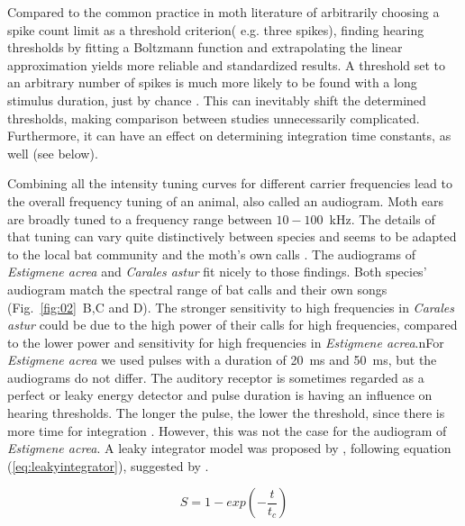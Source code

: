 \documentclass[12pt,a4paper,pdftex]{article}
\newcommand{\species}[1]{\textit{#1}}
\newcommand{\fig}[2]{(Fig.~#1~#2)}
\begin{document}
Compared to the common practice in moth literature of arbitrarily choosing  a spike count limit as a threshold criterion( e.g. three spikes), finding hearing thresholds by fitting a Boltzmann function and extrapolating the linear approximation yields more reliable and standardized results. A threshold set to an arbitrary number of spikes is much more likely to be found with a long stimulus duration, just by chance \cite{waters2003}. This can inevitably shift the determined thresholds, making comparison between studies unnecessarily complicated. Furthermore, it can have an effect on determining integration time constants, as well (see below).

Combining all the intensity tuning curves for different carrier frequencies lead to the overall frequency tuning of an animal, also called an audiogram. Moth ears are broadly tuned to a frequency range between $10-100$~kHz. The details of that tuning can vary quite distinctively between species and seems to be adapted to the local bat community and the moth's own calls \cite{fullard1984b, terhofstede2013, nakano2014}. The audiograms of \species{Estigmene acrea} and \species{Carales astur} fit nicely to those findings. Both species' audiogram match the spectral range of bat calls and their own songs \fig{\ref{fig:02}}{B,C and D}. The stronger sensitivity to high frequencies in \species{Carales astur} could be due to the high power of their calls for high frequencies, compared to the lower power and sensitivity for high frequencies in \species{Estigmene acrea}.nFor \species{Estigmene acrea} we used pulses with a duration of 20~ms and 50~ms, but the audiograms do not differ. The auditory receptor is sometimes regarded as a perfect or leaky energy detector and pulse duration is having an influence on hearing thresholds. The longer the pulse, the lower the threshold, since there is more time for integration \cite{surlykke1988, tougaard1996, tougaard1998}. However, this was not the case for the audiogram of \species{Estigmene acrea}. 
A leaky integrator model was proposed by \cite{waters1996}, following equation (\ref{eq:leakyintegrator}), suggested by \cite{plomp1959}.

\begin{equation}
\label{eq:leakyintegrator}
S = 1 - exp(-\frac{t}{t_c})
\end{equation}
\end{document}
